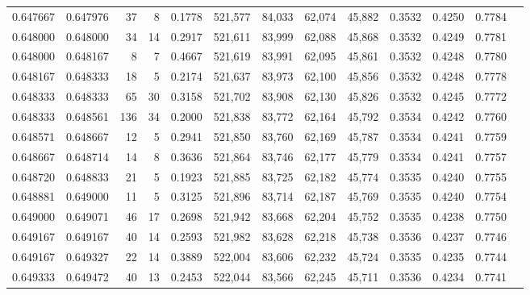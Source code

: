 \begin{tabular}{rrrrrrrrrrrrr}
0.647667 & 0.647976 &    37 &   8 &                                     0.1778 & 521,577 &  84,033 &  62,074 &  45,882 & 0.3532 & 0.4250 & 0.7784 \\
0.648000 & 0.648000 &    34 &  14 &                                     0.2917 & 521,611 &  83,999 &  62,088 &  45,868 & 0.3532 & 0.4249 & 0.7781 \\
0.648000 & 0.648167 &     8 &   7 &                                     0.4667 & 521,619 &  83,991 &  62,095 &  45,861 & 0.3532 & 0.4248 & 0.7780 \\
0.648167 & 0.648333 &    18 &   5 &                                     0.2174 & 521,637 &  83,973 &  62,100 &  45,856 & 0.3532 & 0.4248 & 0.7778 \\
0.648333 & 0.648333 &    65 &  30 &                                     0.3158 & 521,702 &  83,908 &  62,130 &  45,826 & 0.3532 & 0.4245 & 0.7772 \\
0.648333 & 0.648561 &   136 &  34 &                                     0.2000 & 521,838 &  83,772 &  62,164 &  45,792 & 0.3534 & 0.4242 & 0.7760 \\
0.648571 & 0.648667 &    12 &   5 &                                     0.2941 & 521,850 &  83,760 &  62,169 &  45,787 & 0.3534 & 0.4241 & 0.7759 \\
0.648667 & 0.648714 &    14 &   8 &                                     0.3636 & 521,864 &  83,746 &  62,177 &  45,779 & 0.3534 & 0.4241 & 0.7757 \\
0.648720 & 0.648833 &    21 &   5 &                                     0.1923 & 521,885 &  83,725 &  62,182 &  45,774 & 0.3535 & 0.4240 & 0.7755 \\
0.648881 & 0.649000 &    11 &   5 &                                     0.3125 & 521,896 &  83,714 &  62,187 &  45,769 & 0.3535 & 0.4240 & 0.7754 \\
0.649000 & 0.649071 &    46 &  17 &                                     0.2698 & 521,942 &  83,668 &  62,204 &  45,752 & 0.3535 & 0.4238 & 0.7750 \\
0.649167 & 0.649167 &    40 &  14 &                                     0.2593 & 521,982 &  83,628 &  62,218 &  45,738 & 0.3536 & 0.4237 & 0.7746 \\
0.649167 & 0.649327 &    22 &  14 &                                     0.3889 & 522,004 &  83,606 &  62,232 &  45,724 & 0.3535 & 0.4235 & 0.7744 \\
0.649333 & 0.649472 &    40 &  13 &                                     0.2453 & 522,044 &  83,566 &  62,245 &  45,711 & 0.3536 & 0.4234 & 0.7741 \\

\end{tabular}
